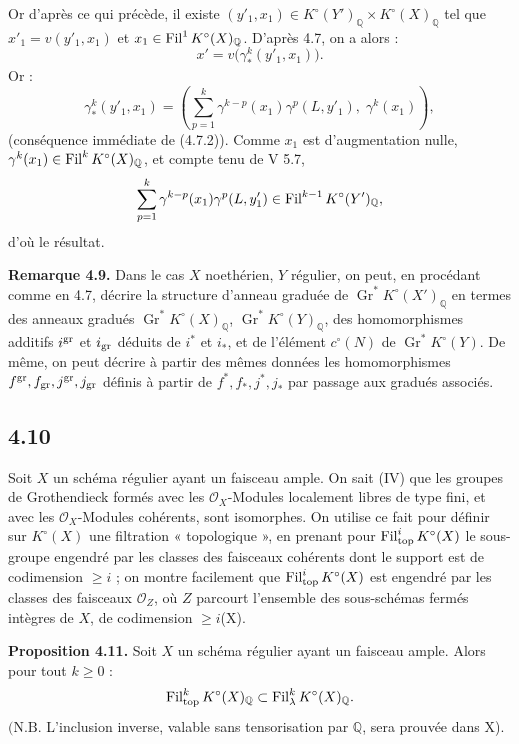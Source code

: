 Or d'après ce qui précède, il existe \((y'_1,x_1)\in K^\circ(Y')_{\mathbb Q}\times K^\circ(X)_{\mathbb Q}\) tel que \(x'_1=v(y'_1,x_1)\) et \(x_1\in\operatorname{Fil}^1K^\circ(X)_{\mathbb Q}\). D'après 4.7, on a alors :
\[
  x'=v\bigl(\gamma^k_*(y'_1,x_1)\bigr).
\]
Or :
\[
  \gamma^k_*(y'_1,x_1)
  =
  \left(\sum_{p=1}^{k}\gamma^{k-p}(x_1)\gamma^p(L,y'_1),\;
  \gamma^k(x_1)\right),
\]
(conséquence immédiate de (4.7.2)). Comme \(x_1\) est d'augmentation nulle, \(\gamma^k(x_1)\in\operatorname{Fil}^kK^\circ(X)_{\mathbb Q}\), et compte tenu de V 5.7,
\[
  \sum_{p=1}^{k}\gamma^{k-p}(x_1)\gamma^p(L,y'_1)
  \in\operatorname{Fil}^{k-1}K^\circ(Y')_{\mathbb Q},
\]
d'où le résultat.

\textbf{Remarque 4.9.} Dans le cas \(X\) noethérien, \(Y\) régulier, on peut, en procédant comme en 4.7, décrire la structure d'anneau graduée de \(\operatorname{Gr}^*K^\circ(X')_{\mathbb Q}\) en termes des anneaux gradués \(\operatorname{Gr}^*K^\circ(X)_{\mathbb Q}\), \(\operatorname{Gr}^*K^\circ(Y)_{\mathbb Q}\), des homomorphismes additifs \(i^{\operatorname{gr}}\) et \(i_{\operatorname{gr}}\) déduits de \(i^*\) et \(i_*\), et de l'élément \(c^\circ(N)\) de \(\operatorname{Gr}^*K^\circ(Y)\). De même, on peut décrire à partir des mêmes données les homomorphismes \(f^{\operatorname{gr}},f_{\operatorname{gr}},j^{\operatorname{gr}},j_{\operatorname{gr}}\) définis à partir de \(f^*,f_*,j^*,j_*\) par passage aux gradués associés.

\subsection*{4.10}

Soit \(X\) un schéma régulier ayant un faisceau ample. On sait (IV\qquad) que les groupes de Grothendieck formés avec les \(\mathcal O_X\)-Modules localement libres de type fini, et avec les \(\mathcal O_X\)-Modules cohérents, sont isomorphes. On utilise ce fait pour définir sur \(K^\circ(X)\) une filtration « topologique », en prenant pour \(\operatorname{Fil}^i_{\mathrm{top}}K^\circ(X)\) le sous-groupe engendré par les classes des faisceaux cohérents dont le support est de codimension \(\ge i\) ; on montre facilement que \(\operatorname{Fil}^i_{\mathrm{top}}K^\circ(X)\) est engendré par les classes des faisceaux \(\mathcal O_Z\), où \(Z\) parcourt l'ensemble des sous-schémas fermés intègres de \(X\), de codimension \(\ge i\)(X\qquad).

\textbf{Proposition 4.11.} Soit \(X\) un schéma régulier ayant un faisceau ample. Alors pour tout \(k\ge0\) :
\[
  \operatorname{Fil}_{\mathrm{top}}^kK^\circ(X)_{\mathbb Q}
  \subset
  \operatorname{Fil}_\lambda^kK^\circ(X)_{\mathbb Q}.
\]
\((\mathrm{N.B.}\) L'inclusion inverse, valable sans tensorisation par \(\mathbb Q\), sera prouvée dans X\qquad).

